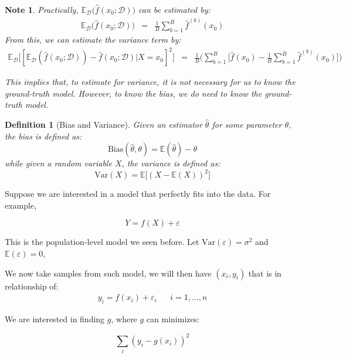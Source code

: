 \documentclass{article}
\theoremstyle{MyNonumberplain}
\theoremstyle{break}
\newcommand{\ev}{\mathbb{E}}
\newcommand{\evd}{\ev_{\mathcal{D}}}
\theoremstyle{break}
\newtheorem{note}{Note}
\theoremstyle{break}
\theoremstyle{break}
\newtheorem{definition}{Definition}[section]
\begin{document}
\begin{notebox}
    \begin{note}
        Practically, $\evd\biggl(\hat{f}(x_0;\mathcal{D})\biggr)$ can be estimated by: 
        \begin{eqnarray*}
            \evd\biggl(\hat{f}(x_0;\mathcal{D})\biggr)&=&\frac{1}{B}\sum_{b=1}^B \hat{f}^{(b)}(x_0)
        \end{eqnarray*}
        From this, we can estimate the variance term by:
            \begin{eqnarray*}
                \evd\biggl[[\evd(\hat{f}(x_0;\mathcal{D}))-\hat{f}(x_0;\mathcal{D})|X=x_0]^2\biggr] &=& \frac{1}{B} \Biggl(\sum_{b=1}^B\biggl[\hat{f}(x_0)-\frac{1}{B}\sum_{b=1}^B\hat{f}^{(b)}(x_0)\biggr]\Biggr)
            \end{eqnarray*}

            This implies that, to estimate for variance, it is not necessary for us to know the ground-truth model. However, to know the bias, we do need to know the ground-truth model.
    \end{note}
\end{notebox}

\begin{defbox}
    \begin{definition}[Bias and Variance]
        Given an estimator $\hat{\theta}$ for some parameter $\theta$, the bias is defined as: 
        $$\text{Bias}(\hat{\theta},\theta)=\ev(\hat{\theta})-\theta$$
        while given a random variable $X$, the variance is defined as:
        $$
            \text{Var}(X)=\ev\bigl[(X-\ev(X))^2\bigr]
        $$
    \end{definition}
\end{defbox}

Suppose we are interested in a model that perfectly fits into the data. For example,

$$Y=f(X)+\varepsilon$$

This is the population-level model we seen before. Let $\text{Var}(\varepsilon)=\sigma^2$ and $\ev{(\varepsilon)}=0$,

We now take samples from such model, we will then have $(x_i,y_i)$ that is in relationship of:
\begin{eqnarray*}
    y_i=f(x_i)+\varepsilon_i &  & i=1,...,n
\end{eqnarray*}

We are interested in finding $g$, where $g$ can minimizes:

$$\sum_{i}(y_i-g(x_i))^2$$
\end{document}
